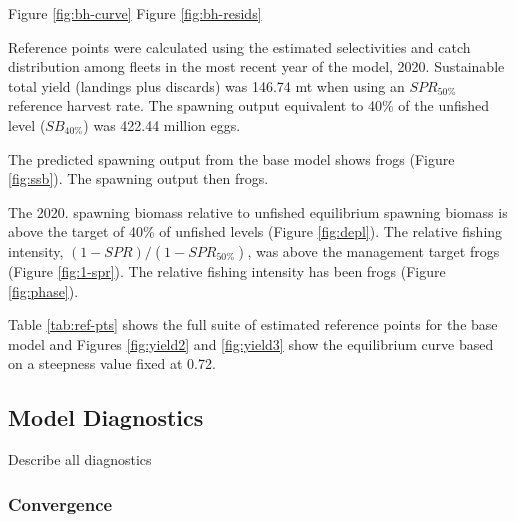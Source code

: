 \documentclass[11pt,
  english,
  a4paper,
]{article}
\begin{document}
\leavevmode\tagmcend\tagstructend

Figure \ref{fig:bh-curve} Figure \ref{fig:bh-resids}

Reference points were calculated using the estimated selectivities and catch distribution among fleets in the most recent year of the model, 2020. Sustainable total yield (landings plus discards) was 146.74 mt when using an {\(SPR_{50\%}\)\leavevmode\tagmcend\tagstructend} reference harvest rate. The spawning output equivalent to 40\% of the unfished level ({\(SB_{40\%}\)\leavevmode\tagmcend\tagstructend}) was 422.44 million eggs.

The predicted spawning output from the base model shows frogs (Figure \ref{fig:ssb}). The spawning output then frogs.

The 2020. spawning biomass relative to unfished equilibrium spawning biomass is above the target of 40\% of unfished levels (Figure \ref{fig:depl}). The relative fishing intensity, {\((1-SPR)/(1-SPR_{50\%})\)\leavevmode\tagmcend\tagstructend}, was above the management target frogs (Figure \ref{fig:1-spr}). The relative fishing intensity has been frogs (Figure \ref{fig:phase}).

Table \ref{tab:ref-pts} shows the full suite of estimated reference points for the base model and Figures \ref{fig:yield2} and \ref{fig:yield3} show the equilibrium curve based on a steepness value fixed at 0.72.


\hypertarget{model-diagnostics}{%
\subsection{Model Diagnostics}\label{model-diagnostics}}

\leavevmode\tagmcend\tagstructend

Describe all diagnostics


\hypertarget{convergence}{%
\subsubsection{Convergence}\label{convergence}}

\leavevmode\tagmcend\tagstructend

\end{document}
